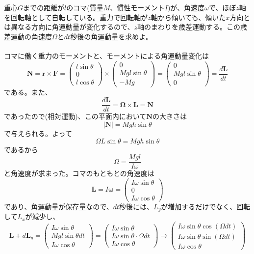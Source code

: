 \documentclass{jsarticle}
\begin{document}
重心\(G\)までの距離が\(l\)のコマ(質量\(M\)、慣性モーメント\(I\))が、角速度\(\omega\)で、ほぼ\(z\)軸を回転軸として自転している。重力で回転軸が\(z\)軸から傾いても、傾いた\(x\)方向とは異なる方向に角運動量が変化するので、\(z\)軸のまわりを歳差運動する。この歳差運動の角速度\(\Omega\)と\(dt\)秒後の角運動量を求めよ。\\
\\
コマに働く重力のモーメントと、モーメントによる角運動量変化は
\[
\bm{N}=\bm{r}\times\bm{F}=\left(\begin{array}{c}
l\sin\theta\\
0\\
l\cos\theta\end{array}\right)\times\left(\begin{array}{c}
0\\
Mgl\sin\theta\\
-Mg\end{array}\right)=\left(\begin{array}{c}
0\\
Mgl\sin\theta\\
0\end{array}\right)=\frac{d\bm{L}}{dt}
\]
である。また、
\[\frac{d\bm{L}}{dt}=\bm{\Omega}\times\bm{L}=\bm{N}\]
であったので(相対運動)、この平面内において\(\bm{N}\)の大きさは
\[\left|\bm{N}\right|=Mgh\sin\theta\]
で与えられる。よって
\[\Omega L\sin\theta=Mgh\sin\theta\]
であるから
\[\Omega=\frac{Mgl}{I\omega}\]
と角速度が求まった。コマのもともとの角速度は
\[\bm{L}=I\bm{\omega}=\left(\begin{array}{c}
I\omega\sin\theta\\
0\\
I\omega\cos\theta\end{array}\right)\]
であり、角運動量が保存量なので、\(dt\)秒後には、\(L_{y}\)が増加するだけでなく、回転して\(L_{x}\)が減少し、
\[\bm{L}+d\bm{L}_{y}=\left(\begin{array}{c}
I\omega\sin\theta\\
Mgl\sin\theta dt\\
I\omega\cos\theta\end{array}\right)=\left(\begin{array}{c}
I\omega\sin\theta\\
I\omega\sin\theta\cdot\Omega dt\\
I\omega\cos\theta\end{array}\right)\rightarrow\left(\begin{array}{c}
I\omega\sin\theta\cos(\Omega dt)\\
I\omega\sin\theta\sin(\Omega dt)\\
I\omega\cos\theta\end{array}\right)\]
\end{document}
